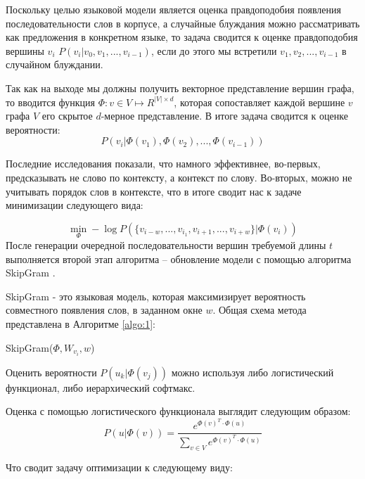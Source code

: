 Поскольку целью языковой модели является оценка правдоподобия появления последовательности слов в корпусе, а случайные блуждания можно рассматривать как предложения в конкретном языке, то задача сводится к оценке правдоподобия вершины $v_i$ $P(v_i| v_0, v_1, ..., v_{i-1})$, если до этого мы встретили  $v_1, v_2, ..., v_{i-1}$ в случайном блуждании.

Так как на выходе мы должны получить векторное представление вершин графа, то вводится функция $\Phi: v \in V \mapsto R^{|V| \times d} $, которая сопоставляет каждой вершине $v$ графа $V$ его скрытое $d$-мерное представление. В итоге задача сводится к оценке вероятности:
$$P(v_i|\Phi(v_1), \Phi(v_2), ..., \Phi(v_{i-1}))$$



Последние исследования показали, что намного эффективнее, во-первых, предсказывать не слово по контексту, а контекст по слову.  Во-вторых, можно не учитывать порядок слов в контексте, что в итоге сводит нас к задаче минимизации следующего вида:

$$\min_{\Phi} -\log P(\{v_{i-w}, ..., v_{i_1}, v_{i+1}, ..., v_{i+w}\} | \Phi (v_i))$$
После генерации очередной последовательности вершин требуемой длины $t$ выполняется второй этап алгоритма -- обновление модели с помощью алгоритма SkipGram \cite{skipgram}. 

SkipGram - это языковая модель, которая максимизирует вероятность совместного появления слов, в заданном  окне $w$. Общая схема метода представлена в Алгоритме \ref{algo:1}:

\begin{algorithm}[H]

    \caption{SkipGram($\Phi, W_{v_i}, w$)}
    \label{algo:1}
\end{algorithm}

Оценить вероятности $P(u_k | \Phi(v_j))$  можно используя либо логистический функционал, либо иерархический софтмакс. 

Оценка с помощью логистического функционала выглядит следующим образом:
$$P(u | \Phi(v)) = \frac{e^{\Phi(v)^T \cdot \Phi(u)}}{\sum_{v \in V} e^{\Phi(v)^T \cdot \Phi(u)}}$$

Что сводит задачу оптимизации к следующему виду:

